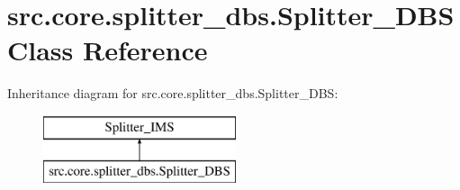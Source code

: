 \hypertarget{classsrc_1_1core_1_1splitter__dbs_1_1Splitter__DBS}{}\section{src.\+core.\+splitter\+\_\+dbs.\+Splitter\+\_\+\+D\+B\+S Class Reference}
\label{classsrc_1_1core_1_1splitter__dbs_1_1Splitter__DBS}
Inheritance diagram for src.\+core.\+splitter\+\_\+dbs.\+Splitter\+\_\+\+D\+B\+S\+:\begin{figure}[H]
\begin{center}
\leavevmode
\includegraphics[height=2.000000cm]{classsrc_1_1core_1_1splitter__dbs_1_1Splitter__DBS}
\end{center}
\end{figure}
